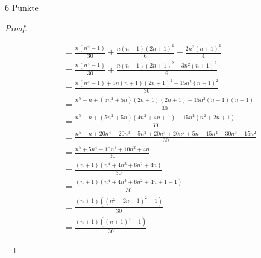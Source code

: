 \documentclass{problemset}
\begin{document}
\begin{problem}[Summenformeln]{6 Punkte}
\begin{proof}
\begin{enumerate}
\begin{align}
			                                        & = \frac{n(n^4 - 1)}{30} + \frac{n(n+1)(2n+1)^2}{6} - \frac{2n^2(n+1)^2}{4}                                \\
			                                        & = \frac{n(n^4 - 1)}{30} + \frac{n(n+1)(2n+1)^2 - 3n^2(n+1)^2}{6}                                          \\
			                                        & = \frac{n(n^4 - 1) + 5n(n+1)(2n+1)^2 - 15n^2(n+1)^2}{30}                                                  \\
			                                        & = \frac{n^5 - n + (5n^2+5n)(2n+1)(2n+1) - 15n^2(n+1)(n+1)}{30}                                            \\
			                                        & = \frac{n^5 - n + (5n^2+5n)(4n^2 + 4n +1) - 15n^2(n^2 + 2n +1)}{30}                                       \\
			                                        & = \frac{n^5 - n + 20n^4 + 20n^3 + 5n^2 + 20n^3 + 20n^2 + 5n - 15n^4- 30n^3 - 15n^2}{30}                   \\
			                                        & = \frac{n^5 + 5n^4 + 10n^3 + 10n^2 + 4n}{30}                                                              \\
			                                        & = \frac{(n+1)(n^4+4n^3+6n^2+4n)}{30} \tag{Polynomdivision}                                                \\
			                                        & = \frac{(n+1)(n^4+4n^3+6n^2+4n + 1 - 1)}{30}                                                              \\
			                                        & = \frac{(n+1)((n^2 + 2n +1)^2 - 1)}{30}                                                                   \\
			                                        & = \frac{(n+1)((n + 1)^4 - 1)}{30}
		      \end{align}
	\end{enumerate}
\end{proof}
\end{problem}
\end{document}
